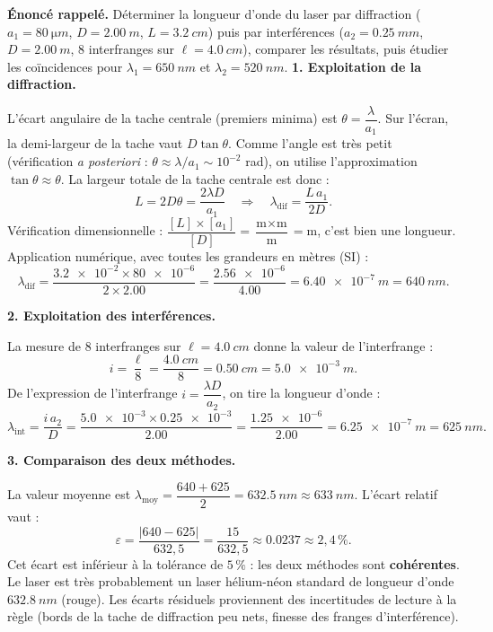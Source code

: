 \documentclass[11pt]{article}
\begin{document}
\begin{exoresolu}
\textbf{Énoncé rappelé.} Déterminer la longueur d'onde du laser par diffraction ($a_1 = \SI{80}{\micro m}$, $D = \SI{2,00}{m}$, $L = \SI{3,2}{cm}$) puis par interférences ($a_2 = \SI{0,25}{mm}$, $D = \SI{2,00}{m}$, $8$ interfranges sur $\ell = \SI{4,0}{cm}$), comparer les résultats, puis étudier les coïncidences pour $\lambda_1 = \SI{650}{nm}$ et $\lambda_2 = \SI{520}{nm}$.
\tcblower
\textbf{1. Exploitation de la diffraction.}

L'écart angulaire de la tache centrale (premiers minima) est $\theta = \dfrac{\lambda}{a_1}$. Sur l'écran, la demi-largeur de la tache vaut $D\tan\theta$. Comme l'angle est très petit (vérification \textit{a posteriori} : $\theta \approx \lambda/a_1 \sim 10^{-2}$ rad), on utilise l'approximation $\tan\theta \approx \theta$. La largeur totale de la tache centrale est donc :
\[ L = 2D\theta = \frac{2\lambda D}{a_1} \quad \Longrightarrow \quad \lambda_{\text{dif}} = \frac{L\,a_1}{2D}. \]
Vérification dimensionnelle : $\dfrac{[L]\times[a_1]}{[D]} = \dfrac{\text{m}\times\text{m}}{\text{m}} = \text{m}$, c'est bien une longueur. Application numérique, avec toutes les grandeurs en mètres (SI) :
\[ \lambda_{\text{dif}} = \frac{\num{3,2e-2} \times \num{80e-6}}{2 \times \num{2,00}} = \frac{\num{2,56e-6}}{\num{4,00}} = \SI{6,40e-7}{m} = \SI{640}{nm}. \]

\textbf{2. Exploitation des interférences.}

La mesure de $8$ interfranges sur $\ell = \SI{4,0}{cm}$ donne la valeur de l'interfrange :
\[ i = \frac{\ell}{8} = \frac{\SI{4,0}{cm}}{8} = \SI{0,50}{cm} = \SI{5,0e-3}{m}. \]
De l'expression de l'interfrange $i = \dfrac{\lambda D}{a_2}$, on tire la longueur d'onde :
\[ \lambda_{\text{int}} = \frac{i\,a_2}{D} = \frac{\num{5,0e-3} \times \num{0,25e-3}}{\num{2,00}} = \frac{\num{1,25e-6}}{\num{2,00}} = \SI{6,25e-7}{m} = \SI{625}{nm}. \]

\textbf{3. Comparaison des deux méthodes.}

La valeur moyenne est $\lambda_{\text{moy}} = \dfrac{640 + 625}{2} = \SI{632,5}{nm} \approx \SI{633}{nm}$. L'écart relatif vaut :
\[ \varepsilon = \frac{|640 - 625|}{632,5} = \frac{15}{632,5} \approx \num{0,0237} \approx 2,4\,\%. \]
Cet écart est inférieur à la tolérance de $5\,\%$ : les deux méthodes sont \textbf{cohérentes}. Le laser est très probablement un laser hélium-néon standard de longueur d'onde $\SI{632,8}{nm}$ (rouge). Les écarts résiduels proviennent des incertitudes de lecture à la règle (bords de la tache de diffraction peu nets, finesse des franges d'interférence).


\end{exoresolu}
\end{document}
